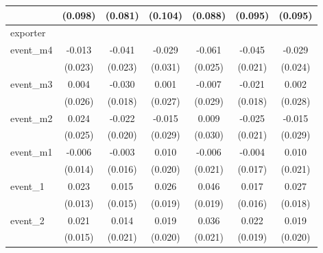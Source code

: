 {\begin{tabular}{l*{6}{c}}
            &     (0.098)         &     (0.081)         &     (0.104)         &     (0.088)         &     (0.095)         &     (0.095)         \\
\hline
exporter    &                     &                     &                     &                     &                     &                     \\
event\_m4    &      -0.013         &      -0.041         &      -0.029         &      -0.061\sym{*}  &      -0.045\sym{*}  &      -0.029         \\
            &     (0.023)         &     (0.023)         &     (0.031)         &     (0.025)         &     (0.021)         &     (0.024)         \\
[1em]
event\_m3    &       0.004         &      -0.030         &       0.001         &      -0.007         &      -0.021         &       0.002         \\
            &     (0.026)         &     (0.018)         &     (0.027)         &     (0.029)         &     (0.018)         &     (0.028)         \\
[1em]
event\_m2    &       0.024         &      -0.022         &      -0.015         &       0.009         &      -0.025         &      -0.015         \\
            &     (0.025)         &     (0.020)         &     (0.029)         &     (0.030)         &     (0.021)         &     (0.029)         \\
[1em]
event\_m1    &      -0.006         &      -0.003         &       0.010         &      -0.006         &      -0.004         &       0.010         \\
            &     (0.014)         &     (0.016)         &     (0.020)         &     (0.021)         &     (0.017)         &     (0.021)         \\
[1em]
event\_1     &       0.023         &       0.015         &       0.026         &       0.046\sym{*}  &       0.017         &       0.027         \\
            &     (0.013)         &     (0.015)         &     (0.019)         &     (0.019)         &     (0.016)         &     (0.018)         \\
[1em]
event\_2     &       0.021         &       0.014         &       0.019         &       0.036         &       0.022         &       0.019         \\
            &     (0.015)         &     (0.021)         &     (0.020)         &     (0.021)         &     (0.019)         &     (0.020)         \\

\end{tabular}}
